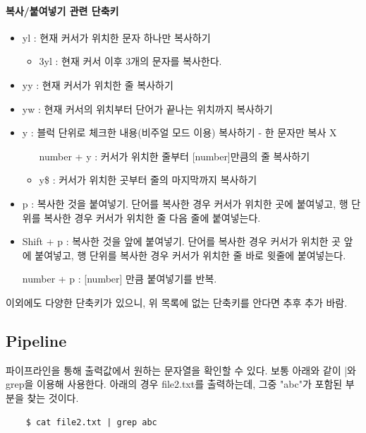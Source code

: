 \paragraph{복사/붙여넣기 관련 단축키}
\begin{itemize}[$\bullet$]
    \item yl : 현재 커서가 위치한 문자 하나만 복사하기
        \begin{itemize}[Ex)]
            \item 3yl : 현재 커서 이후 3개의 문자를 복사한다.
        \end{itemize}
    \item yy : 현재 커서가 위치한 줄 복사하기
    \item yw : 현재 커서의 위치부터 단어가 끝나는 위치까지 복사하기
    \item y : 블럭 단위로 체크한 내용(비주얼 모드 이용) 복사하기 - 한 문자만 복사 X
        \begin{itemize}[Ex)]
            \item [number] + y : 커서가 위치한 줄부터 [number]만큼의 줄 복사하기
            \item y\$ : 커서가 위치한 곳부터 줄의 마지막까지 복사하기
        \end{itemize}
    \item p : 복사한 것을 붙여넣기. 단어를 복사한 경우 커서가 위치한 곳에 붙여넣고, 행 단위를 복사한 경우 커서가 위치한 줄 다음 줄에 붙여넣는다.
    \item Shift + p : 복사한 것을 앞에 붙여넣기. 단어를 복사한 경우 커서가 위치한 곳 앞에 붙여넣고, 행 단위를 복사한 경우 커서가 위치한 줄 바로 윗줄에 붙여넣는다.
    \item [number] + p : [number] 만큼 붙여넣기를 반복.
\end{itemize}

이외에도 다양한 단축키가 있으니, 위 목록에 없는 단축키를 안다면 추후 추가 바람.

\subsection{Pipeline}
파이프라인을 통해 출력값에서 원하는 문자열을 확인할 수 있다. 보통 아래와 같이 |와 grep을 이용해 사용한다. 아래의 경우 file2.txt를 출력하는데, 그중 "abc"가 포함된 부분을 찾는 것이다.
    \begin{lstlisting}
    $ cat file2.txt | grep abc
    \end{lstlisting}
